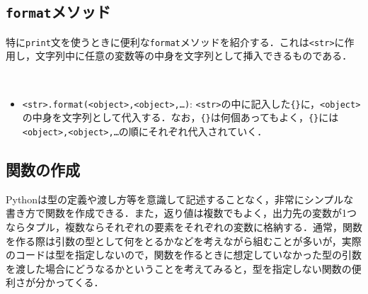 \begin{cod}[\texttt{py3.py}]　
}]{code/py3.py}
\vspace{-7pt}
\begin{lstlisting}
<class 'str'>
<class 'type'>
\end{lstlisting}
\end{cod}
\vspace{-10pt}

\subsection{\texttt{format}メソッド}

特に\texttt{print}文を使うときに便利な\texttt{format}メソッドを紹介する．これは\texttt{<str>}に作用し，文字列中に任意の変数等の中身を文字列として挿入できるものである．

\begin{gram}　
\begin{itemize}
\item \texttt{<str>.format(<object>,<object>,\ldots)}: \texttt{<str>}の中に記入した\texttt{\{\}}に，\texttt{<object>}の中身を文字列として代入する．なお，\texttt{\{\}}は何個あってもよく，\texttt{\{\}}には\texttt{<object>,<object>,\ldots}の順にそれぞれ代入されていく．
\end{itemize}
\end{gram}

\begin{cod}[\texttt{py4.py}]　
}]{code/py4.py}
\vspace{-7pt}
\begin{lstlisting}
p={'x': 3, 'y': 5}, type=<class 'dict'>
\end{lstlisting}
\end{cod}
\vspace{-10pt}


\subsection{関数の作成}
Pythonは型の定義や渡し方等を意識して記述することなく，非常にシンプルな書き方で関数を作成できる．また，返り値は複数でもよく，出力先の変数が1つならタプル，複数ならそれぞれの要素をそれぞれの変数に格納する．通常，関数を作る際は引数の型として何をとるかなどを考えながら組むことが多いが，実際のコードは型を指定しないので，関数を作るときに想定していなかった型の引数を渡した場合にどうなるかということを考えてみると，型を指定しない関数の便利さが分かってくる．

